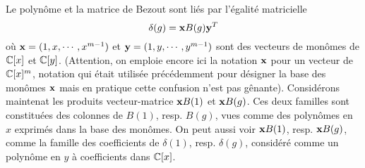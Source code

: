 \documentclass{standalone}
\begin{document}
  \begin{rem}
  Le polynôme et la matrice de Bezout sont liés par l'égalité matricielle
  \begin{equation}
  	\delta(g) = \bold{x} B(g) \bold{y}^T
  \end{equation}
  où $\bold{x} = (1, x,\cdots, x^{m-1})$ et $\bold{y} = (1, y,\cdots, y^{m-1})$ sont des vecteurs de monômes de $\mathbb{C}[x]$ et $\mathbb{C}[y]$. (Attention, on emploie encore ici la notation ${\bold x}$ pour un vecteur de $\mathbb{C}[x]^m$, notation qui était utilisée précédemment pour désigner la base des monômes ${\bold x}$ mais en pratique cette confusion n'est pas gênante).
  Considérons maintenat les produits vecteur-matrice $\bold{x}B(1)$ et $\bold{x}B(g)$. Ces deux familles sont constituées des colonnes de $B(1)$, resp. $B(g)$, vues comme des polynômes en $x$ exprimés dans la base des monômes. On peut aussi voir $\bold{x}B(1)$, resp. $\bold{x}B(g)$, comme la famille des coefficients de $\delta(1)$, resp. $\delta(g)$, considéré comme un polynôme en $y$ à coefficients dans $\mathbb{C}[x]$.
  \end{rem}
\end{document}
